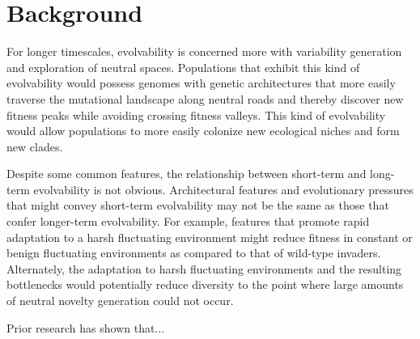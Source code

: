 \documentclass[PhD]{msu-thesis}
\begin{document}
\section{Background}

For longer timescales,
evolvability is concerned more with variability generation and exploration of neutral spaces. Populations that exhibit this kind of evolvability would possess genomes with genetic architectures
that more easily traverse the mutational landscape along neutral roads and thereby discover new fitness peaks while avoiding crossing fitness valleys. This kind of evolvability would allow populations to more easily colonize new ecological niches and form new clades\cite{kirschner_evolvability_1998,brookfield_evolution:_2001}.

Despite some common features, the relationship between short-term and long-term evolvability is not obvious. Architectural features and evolutionary pressures that might convey short-term evolvability may not be the same as those that confer longer-term evolvability\cite{pigliucci_is_2008}. For example, features that promote rapid adaptation to a harsh fluctuating environment might reduce fitness in constant or benign fluctuating environments as compared to that of wild-type invaders. Alternately, the adaptation to harsh fluctuating environments and the resulting bottlenecks would potentially reduce diversity to the point where large amounts of neutral novelty generation could not occur.

Prior research has shown that...
\end{document}
